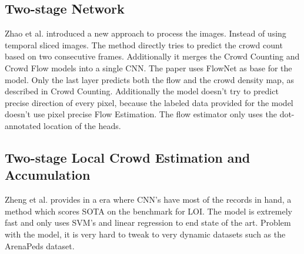 \subsection{Two-stage Network}
Zhao et al. \cite{leibe_crossing-line_2016} introduced a new approach to process the images. Instead of using temporal sliced images. The method directly tries to predict the crowd count based on two consecutive frames. Additionally it merges the Crowd Counting and Crowd Flow models into a single CNN. The paper uses FlowNet as base for the model. Only the last layer predicts both the flow and the crowd density map, as described in Crowd Counting. Additionally the model doesn't try to predict precise direction of every pixel, because the labeled data provided for the model doesn't use pixel precise Flow Estimation. The flow estimator only uses the dot-annotated location of the heads.

\subsection{Two-stage Local Crowd Estimation and Accumulation}
Zheng et al. \cite{zheng_cross-line_2019} provides in a era where CNN's have most of the records in hand, a method which scores SOTA on the benchmark for LOI. The model is extremely fast and only uses SVM's and linear regression to end state of the art. Problem with the model, it is very hard to tweak to very dynamic datasets such as the ArenaPeds dataset.